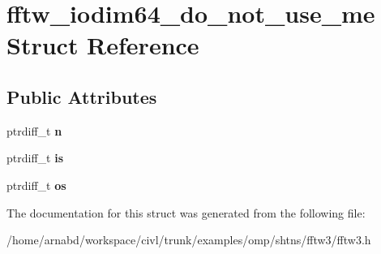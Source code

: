 \hypertarget{structfftw__iodim64__do__not__use__me}{}\section{fftw\+\_\+iodim64\+\_\+do\+\_\+not\+\_\+use\+\_\+me Struct Reference}
\label{structfftw__iodim64__do__not__use__me}
\subsection*{Public Attributes}
\begin{DoxyCompactItemize}
\item 
\hypertarget{structfftw__iodim64__do__not__use__me_a19f8739d839b44db63c3aa1696a3a038}{}ptrdiff\+\_\+t {\bfseries n}\label{structfftw__iodim64__do__not__use__me_a19f8739d839b44db63c3aa1696a3a038}

\item 
\hypertarget{structfftw__iodim64__do__not__use__me_a1b9164674e2d091e8bde88c8d1bb7b6e}{}ptrdiff\+\_\+t {\bfseries is}\label{structfftw__iodim64__do__not__use__me_a1b9164674e2d091e8bde88c8d1bb7b6e}

\item 
\hypertarget{structfftw__iodim64__do__not__use__me_a44118d774124bdaa670f640537b151cf}{}ptrdiff\+\_\+t {\bfseries os}\label{structfftw__iodim64__do__not__use__me_a44118d774124bdaa670f640537b151cf}

\end{DoxyCompactItemize}


The documentation for this struct was generated from the following file\+:\begin{DoxyCompactItemize}
\item 
/home/arnabd/workspace/civl/trunk/examples/omp/shtns/fftw3/fftw3.\+h\end{DoxyCompactItemize}
